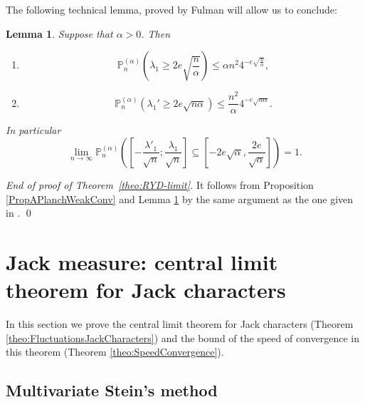 \documentclass[11pt]{amsart}
\theoremstyle{plain}
\newtheorem{lemma}{Lemma}[section]
\theoremstyle{remark}
\newcommand{\PP}{\mathbb{P}}
\begin{document}
The following technical lemma,
proved by Fulman \cite[Lemma 6.6]{FulmanFluctuationChA2}
will allow us to conclude:

\begin{lemma}
    \label{lem:FiniteSupport}
Suppose that $\alpha > 0$. Then
\begin{enumerate}
\item
\[ \PP_n^{(\alpha)}\left(\lambda_1\geq 2 e\sqrt{\frac{n}{\alpha}}\right) \leq \alpha n^2 4^{-e\sqrt{\frac{n}{\alpha}}}, \]
\item
\[ \PP_n^{(\alpha)}(\lambda_1' \geq 2 e\sqrt{n\alpha}) \leq \frac{n^2}{\alpha} 4^{-e\sqrt{n\alpha}}. \]
\end{enumerate}
In particular
\[\lim_{n \to \infty} \PP_n^{(\alpha)} \left(
 \left[-\frac{\lambda'_1}{\sqrt{n}};\frac{\lambda_1}{\sqrt{n}}\right] \subseteq \left[-2e\sqrt{\alpha}, \frac{2e}{\sqrt{\alpha}}\right]
 \right) =1. \]
\end{lemma}\medskip

{\em End of proof of Theorem~\ref{theo:RYD-limit}.}
    It follows from Proposition \ref{PropAPlanchWeakConv} and Lemma
    \ref{lem:FiniteSupport}
    by the same argument as the one given in
    \cite[Theorem 5.5]{IvanovOlshanski2002}.
\qed

\section{Jack measure: central limit theorem for Jack characters}
\label{sect:CLT}

In this section we prove the central limit theorem for Jack characters
(Theorem \ref{theo:FluctuationsJackCharacters})
and the bound of the speed of convergence in this theorem
(Theorem \ref{theo:SpeedConvergence}).

\subsection{Multivariate Stein's method}
\end{document}
